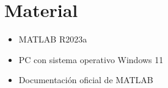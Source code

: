 
\section{Material}
\begin{itemize}
    \item MATLAB R2023a
    \item PC con sistema operativo Windows 11
    \item Documentación oficial de MATLAB
\end{itemize}